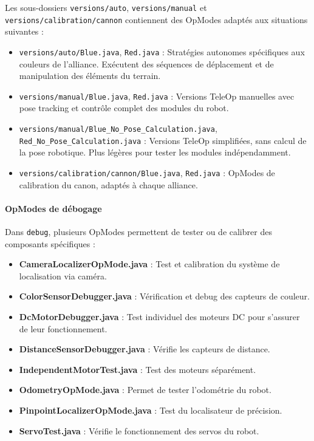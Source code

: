 \documentclass[12pt, a4paper]{report}
\begin{document}
    Les sous-dossiers \texttt{versions/auto}, \texttt{versions/manual} et\\ \texttt{versions/calibration/cannon} contiennent des OpModes adaptés aux situations suivantes :

    \begin{itemize}
        \item \texttt{versions/auto/Blue.java}, \texttt{Red.java} : Stratégies autonomes spécifiques aux couleurs de l’alliance. Exécutent des séquences de déplacement et de manipulation des éléments du terrain.

        \item \texttt{versions/manual/Blue.java}, \texttt{Red.java} : Versions TeleOp manuelles avec pose tracking et contrôle complet des modules du robot.

        \item \texttt{versions/manual/Blue\_No\_Pose\_Calculation.java}, \texttt{Red\_No\_Pose\_Calculation.java} : Versions TeleOp simplifiées, sans calcul de la pose robotique. Plus légères pour tester les modules indépendamment.

        \item \texttt{versions/calibration/cannon/Blue.java}, \texttt{Red.java} : OpModes de calibration du canon, adaptés à chaque alliance.
    \end{itemize}

    \paragraph{OpModes de débogage}

    Dans \texttt{debug}, plusieurs OpModes permettent de tester ou de calibrer des composants spécifiques :

    \begin{itemize}
        \item \textbf{CameraLocalizerOpMode.java} : Test et calibration du système de localisation via caméra.
        \item \textbf{ColorSensorDebugger.java} : Vérification et debug des capteurs de couleur.
        \item \textbf{DcMotorDebugger.java} : Test individuel des moteurs DC pour s'assurer de leur fonctionnement.
        \item \textbf{DistanceSensorDebugger.java} : Vérifie les capteurs de distance.
        \item \textbf{IndependentMotorTest.java} : Test des moteurs séparément.
        \item \textbf{OdometryOpMode.java} : Permet de tester l’odométrie du robot.
        \item \textbf{PinpointLocalizerOpMode.java} : Test du localisateur de précision.
        \item \textbf{ServoTest.java} : Vérifie le fonctionnement des servos du robot.
    \end{itemize}
\end{document}

